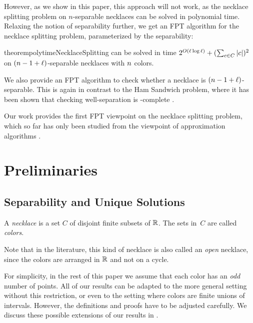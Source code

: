 \documentclass[a4paper,UKenglish,cleveref, thm-restate]{lipics-v2021}
\begin{document}
However, as we show in this paper, this approach will not work, as the necklace splitting problem on $n$-separable necklaces can be solved in polynomial time.
Relaxing the notion of separability further, we get an FPT algorithm for the necklace splitting problem, parameterized by the separability:

\begin{restatable}{theorem}{polytimeNecklaceSplitting}\label{thm:polytimeNecklaceSplitting_(n-1+l)-separable}
    \TwoThiefNecklaceSplitting can be solved in time $2^{O(\constB\log\constB)}+(\sum_{c\in\Colors}|c|)^2$ on $(\dimension-1+\constB)$-separable necklaces \Colors with $\dimension$ colors.
\end{restatable}

We also provide an FPT algorithm to check whether a necklace is $(\dimension-1+\constB)$-separable.
This is again in contrast to the Ham Sandwich problem, where it has been shown that checking well-separation is \coNP-complete \cite{WellSeparationCoNP}.

Our work provides the first FPT viewpoint on the necklace splitting problem, which so far has only been studied from the viewpoint of approximation algorithms \cite{alonApproximation}.


\section{Preliminaries}\label{sec:preliminaries}
\subsection{Separability and Unique Solutions}

\begin{definition}[Necklace]
    A \emph{necklace} is a set $C$ of disjoint finite subsets of $\mathbb{R}$. The sets in~$C$ are called \emph{colors}.
\end{definition}

Note that in the literature, this kind of necklace is also called an \emph{open} necklace, since the colors are arranged in $\mathbb{R}$ and not on a cycle.

For simplicity, in the rest of this paper we assume that each color has an \emph{odd} number of points. All of our results can be adapted to the more general setting without this restriction, or even to the setting where colors are finite unions of intervals. However, the definitions and proofs have to be adjusted carefully. We discuss these possible extensions of our results in .
\end{document}
